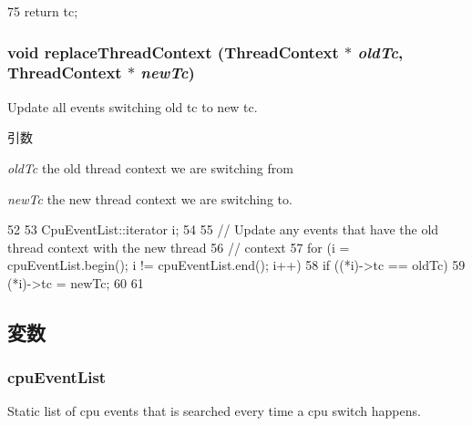 \begin{DoxyCode}
75 { return tc; }
\end{DoxyCode}
\hypertarget{classCpuEvent_abc7c937eda3f3c20297a24ba96396447}{
\subsubsection[{replaceThreadContext}]{\setlength{\rightskip}{0pt plus 5cm}void replaceThreadContext ({\bf ThreadContext} $\ast$ {\em oldTc}, \/  {\bf ThreadContext} $\ast$ {\em newTc})}}
\label{classCpuEvent_abc7c937eda3f3c20297a24ba96396447}
Update all events switching old tc to new tc. 
\begin{DoxyParams}{引数}
\item[{\em oldTc}]the old thread context we are switching from \item[{\em newTc}]the new thread context we are switching to. \end{DoxyParams}



\begin{DoxyCode}
52 {
53     CpuEventList::iterator i;
54 
55     // Update any events that have the old thread context with the new thread
56     // context
57     for (i = cpuEventList.begin(); i != cpuEventList.end(); i++) {
58         if ((*i)->tc == oldTc)
59             (*i)->tc = newTc;
60     }
61 }
\end{DoxyCode}


\subsection{変数}
\hypertarget{classCpuEvent_a8117445cf117d748705531a5145dc9f7}{
\subsubsection[{cpuEventList}]{ {\bf cpuEventList}}}
\label{classCpuEvent_a8117445cf117d748705531a5145dc9f7}
Static list of cpu events that is searched every time a cpu switch happens.

